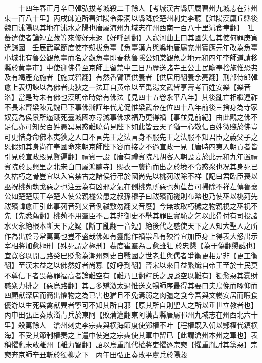 　　十四年春正月辛巳韓弘拔考城殺二千餘人【考城漢古縣唐屬曹州九城志在汴州東一百八十里】丙戌師道所署沭陽令梁洞以縣降於楚州刺史李聽【沭陽漢廩丘縣後魏曰沭陽以其地在沭水之陽也唐屬海州九域志在州西南一百八十里沭食聿翻】　吐蕃遣使者論短立藏等來修好未返【好呼到翻】入寇河曲上曰其國失信其使何罪庚寅遣歸國　壬辰武寧節度使李愬拔魚臺【魚臺漢方與縣地唐屬兖州寶應元年改為魚臺小城北有魯公觀魚臺而名之觀魚臺即春秋魯隱公如棠觀魚之地元和四年李師道請移縣於黄臺市】中使迎佛骨至京師上留禁中三日乃歷送諸寺王公士民瞻奉捨施惟恐弗及有竭產充施者【施式智翻】有然香臂頂供養者【供居用翻養余亮翻】刑部侍郎韓愈上表切諫以為佛者夷狄之一法耳自黄帝以至禹湯文武皆享壽考百姓安樂【樂音洛】當是時未有佛也漢明帝時始有佛法【見四十五卷永平八年】其後亂亡相繼運祚不長宋齊梁陳元魏已下事佛漸謹年代尤促惟梁武帝在位四十八年前後三捨身為寺家奴竟為侯景所逼餓死臺城國亦尋滅事佛求福乃更得禍【事並見前紀】由此觀之佛不足信亦可知矣百姓愚冥易惑難曉苟見陛下如此皆云天子猶一心敬信百姓微賤於佛豈可更惜身命佛本夷狄之人口不言先王之法言身不服先王之法服不知君臣之義父子之恩假如其身尚在奉國命來朝京師陛下容而接之不過宣政一見【唐時四夷入朝貢者皆引見於宣政殿見賢遍翻】禮賓一設【唐有禮賓院凡胡客人朝設宴於此元和九年置禮賓院於長興里之北宋白曰屬鴻臚寺】賜衣一襲衛而出之於境不令惑衆也况其身死已久枯朽之骨豈宜以入宫禁古之諸侯行弔於國尚先以桃茢祓除不祥【記曰君臨臣喪以巫祝桃茢執戈惡之也注云為有凶邪之氣在側桃鬼所惡也茢萑苕可掃除不祥左傳魯襄公如楚楚康王卒楚人使公親襚公患之叔孫穆子曰祓殯而襚則布幣也乃使巫以桃茢先祓殯韓愈正引此事茢音列又音例祓敷勿翻又音廢】今無故取朽穢之物親視之巫祝不先【先悉薦翻】桃茢不用羣臣不言其非御史不舉其罪臣實恥之乞以此骨付有司投諸水火永絶根本斷天下之疑【斷丁亂翻一音短】絶後代之惑使天下之人知大聖人之所作為出於尋常萬萬也豈不盛哉佛如有靈能作禍祟凡有殃咎宜加臣身上得表大怒出示宰相將加愈極刑【殊死謂之極刑】裴度崔羣為言愈雖狂於忠懇【為于偽翻懇誠也】宜寛容以開言路癸巳貶愈為潮州刺史自戰國之世老莊與儒者爭衡更相是非【更工衡翻】至漢末益之以佛然好者尚寡【好呼到翻】晉宋以來日益繁熾自帝王至於士民莫不尊信下者畏慕罪福高者論難空有【難乃旦翻釋氏之說談空以難有】獨愈惡其蠧財惑衆力排之【惡烏路翻】其言多矯激太過惟送文暢師序最得其要曰夫鳥俛而啄仰而四顧獸深居而簡出懼物之為已害也猶且不免焉弱之肉彊之食今吾與文暢安居而暇食優游以生死與禽獸異者寧可不知其所自邪【原其所自則聖人之所以垂世立教者也】　丙申田弘正奏敗淄青兵於東阿【敗蒲邁翻東阿漢古縣唐屬鄆州九域志在州西北六十里】殺萬餘人　滄州刺史李宗奭與横海節度使鄭權不叶【程權既入朝以鄭權代鎮横海】不受其節制權奏之上遣中使追之宗奭使其軍中留已【此謂滄州本州之軍也】表稱懼亂未敢離州【離力智翻】詔以烏重胤代權將吏懼逐宗奭【懼重胤討其黨惡】宗奭奔京師辛丑斬於獨柳之下　丙午田弘正奏敗平盧兵於陽穀

